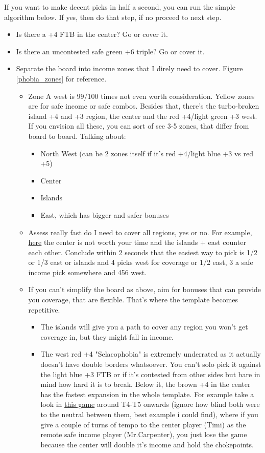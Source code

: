 If you want to make decent picks in half a second, you can run the simple algorithm below. If yes, then do that step, if no proceed to next step.
\begin{itemize}
    \item Is there a +4 FTB in the center? Go or cover it.
    \item Is there an uncontested safe green +6 triple? Go or cover it.
    \item Separate the board into income zones that I direly need to cover. Figure \ref{phobia_zones} for reference.
    \begin{itemize}
        \item Zone A west is 99/100 times not even worth consideration. Yellow zones are for safe income or safe combos. Besides that, there's the turbo-broken island +4 and +3 region, the center and the red +4/light green +3 west. If you envision all these, you can sort of see 3-5 zones, that differ from board to board. Talking about:
        \begin{itemize}
            \item North West (can be 2 zones itself if it's red +4/light blue +3 vs red +5)
            \item Center
            \item Islands
            \item East, which has bigger and safer bonuses
        \end{itemize}
        \item Assess really fast do I need to cover all regions, yes or no. For example, \href{https://www.warzone.com/MultiPlayer?GameID=39333446}{here} the center is not worth your time and the islands + east counter each other. Conclude within 2 seconds that the easiest way to pick is 1/2 or 1/3 east or islands and 4 picks west for coverage or 1/2 east, 3 a safe income pick somewhere and 456 west.
        \item If you can't simplify the board as above, aim for bonuses that can provide you coverage, that are flexible. That's where the template becomes repetitive.
        \begin{itemize}
            \item The islands will give you a path to cover any region you won't get coverage in, but they might fall in income.
            \item The west red +4 "Selacophobia" is extremely underrated as it actually doesn't have double borders whatsoever. You can't solo pick it against the light blue +3 FTB or if it's contested from other sides but bare in mind how hard it is to break. Below it, the brown +4 in the center has the fastest expansion in the whole template. For example take a look in \href{https://www.warzone.com/MultiPlayer?GameID=35123636}{this game} around T4-T5 onwards (ignore how blind both were to the neutral between them, best example i could find), where if you give a couple of turns of tempo to the center player (Timi) as the remote safe income player (Mr.Carpenter), you just lose the game because the center will double it's income and hold the chokepoints.
        \end{itemize}
    \end{itemize}
\end{itemize}